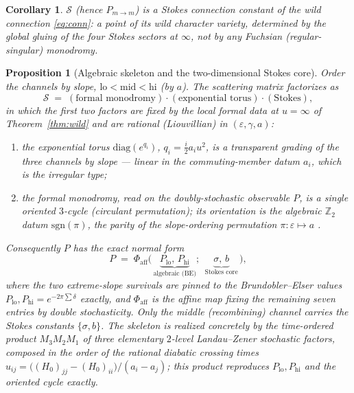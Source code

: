 \documentclass[11pt]{article}
\newtheorem{proposition}{Proposition}
\newtheorem{corollary}{Corollary}
\theoremstyle{definition}
\newcommand{\eps}{\varepsilon}
\newcommand{\diag}{\mathrm{diag}}
\newcommand{\Scat}{\mathcal{S}}
\newcommand{\Pmid}{P_{m\to m}}
\begin{document}
\begin{corollary}\label{cor:stokes}
$\Scat$ (hence $\Pmid$) is a \emph{Stokes connection constant} of the wild connection \eqref{eq:conn}: a point
of its wild character variety, determined by the global gluing of the four Stokes sectors at $\infty$, not by
any Fuchsian (regular-singular) monodromy.
\end{corollary}

\begin{proposition}[Algebraic skeleton and the two-dimensional Stokes core]\label{prop:skeleton}
Order the channels by slope, $\mathrm{lo}<\mathrm{mid}<\mathrm{hi}$ (by $a$). The scattering matrix factorizes
as
\[
\Scat \;=\; (\text{formal monodromy})\cdot(\text{exponential torus})\cdot(\text{Stokes}),
\]
in which the first two factors are fixed by the \emph{local formal data} at $u=\infty$ of
Theorem~\ref{thm:wild} and are rational (Liouvillian) in $(\eps,\gamma,a)$:
\begin{enumerate}
\item[\textup{(a)}] the \emph{exponential torus} $\diag(e^{q_i})$, $q_i=\tfrac{i}{2}a_iu^2$, is a transparent
grading of the three channels by slope --- linear in the commuting-member datum $a_i$, which \emph{is} the
irregular type;
\item[\textup{(b)}] the \emph{formal monodromy}, read on the doubly-stochastic observable $P$, is a single
oriented $3$-cycle (circulant permutation); its orientation is the algebraic $\mathbb{Z}_2$ datum
$\mathrm{sgn}(\pi)$, the parity of the slope-ordering permutation $\pi:\eps\mapsto a$ \cite{OWY}.
\end{enumerate}
Consequently $P$ has the exact normal form
\[
P \;=\; \Phi_{\mathrm{aff}}\big(\,\underbrace{P_{\mathrm{lo}},\,P_{\mathrm{hi}}}_{\text{algebraic (BE)}};\ \
\underbrace{\sigma,\,b}_{\text{Stokes core}}\,\big),
\]
where the two extreme-slope survivals are pinned to the Brundobler--Elser values
$P_{\mathrm{lo}},P_{\mathrm{hi}}=e^{-2\pi\sum\delta}$ \emph{exactly}, and $\Phi_{\mathrm{aff}}$ is the affine
map fixing the remaining seven entries by double stochasticity. Only the middle (recombining) channel carries
the Stokes constants $\{\sigma,b\}$. The skeleton is realized concretely by the time-ordered product
$M_3M_2M_1$ of three elementary $2$-level Landau--Zener stochastic factors, composed in the order of the
rational diabatic crossing times $u_{ij}=\big((H_0)_{jj}-(H_0)_{ii}\big)/(a_i-a_j)$; this product reproduces
$P_{\mathrm{lo}},P_{\mathrm{hi}}$ and the oriented cycle exactly.
\end{proposition}
\end{document}
